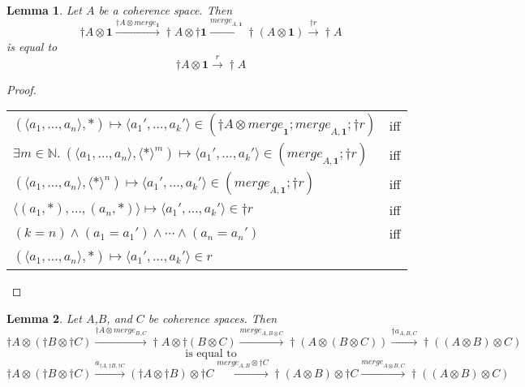 \documentclass{article}
\newtheorem{lemma}{Lemma}
\newcommand{\mbf}{\mathbf}
\begin{document}
\begin{lemma}
Let $A$ be a coherence space. Then 
$$\dagger A \otimes \mbf{1} \overset{\dagger A \otimes \mathit{merge_\mbf{1}}}{\longrightarrow} \dagger A \otimes \dagger \mbf{1} \overset{\mathit{merge}_{A,\mbf{1}}}{\longrightarrow} \dagger(A \otimes \mbf{1}) \overset{\dagger r}{\longrightarrow} \dagger A$$
is equal to
$$\dagger A \otimes \mbf{1} \overset{r}{\longrightarrow} \dagger A$$
\end{lemma}

\begin{proof}~\\

\begin{tabular}{ll}
$(\langle a_1, \ldots, a_n \rangle, \ast) \mapsto \langle a_1', \ldots, a_k' \rangle \in 
(\dagger A \otimes \mathit{merge}_{\mbf{1}};\mathit{merge}_{A,\mbf{1}};\dagger r)$ & iff \\
$\exists m \in \mathbb N.~(\langle a_1, \ldots, a_n \rangle, \langle \ast \rangle^m) \mapsto \langle a_1', \ldots, a_k' \rangle \in 
(\mathit{merge}_{A,\mbf{1}};\dagger r)$ & iff \\
$(\langle a_1,\ldots,a_n\rangle,\langle \ast \rangle^n) \mapsto \langle a_1', \ldots, a_k' \rangle \in (\mathit{merge}_{A,\mbf{1}};\dagger r)$ & iff \\
$\langle (a_1,\ast),\ldots,(a_n,\ast) \rangle \mapsto \langle a_1', \ldots, a_k' \rangle \in \dagger r$ & iff \\
$(k = n) \wedge (a_1 = a_1') \wedge \cdots \wedge (a_n = a_n')$ & iff \\
$(\langle a_1, \ldots, a_n \rangle, \ast) \mapsto \langle a_1', \ldots, a_k' \rangle \in r$ & ~
\end{tabular}
 
\end{proof}


\begin{lemma}
Let $A$,$B$, and $C$ be coherence spaces. Then 
$$\dagger A \otimes (\dagger B \otimes \dagger C) \overset{\dagger A \otimes \mathit{merge}_{B,C}}{\longrightarrow} \dagger A \otimes \dagger(B \otimes C) \overset{\mathit{merge}_{A,B \otimes C}}{\longrightarrow} \dagger(A \otimes (B \otimes C)) \overset{\dagger a_{A,B,C}}{\longrightarrow} \dagger((A \otimes B) \otimes C)$$
$$\text{is equal to}$$ 
$$\dagger A \otimes (\dagger B \otimes \dagger C) \overset{a_{\dagger A, \dagger B, \dagger C}}{\longrightarrow} (\dagger A \otimes \dagger B) \otimes \dagger C \overset{\mathit{merge_{A,B} \otimes \dagger C}}{\longrightarrow} \dagger (A \otimes B) \otimes \dagger C \overset{\mathit{merge}_{A \otimes B,C}}{\longrightarrow} \dagger((A \otimes B) \otimes C)$$
\end{lemma}
\end{document}
